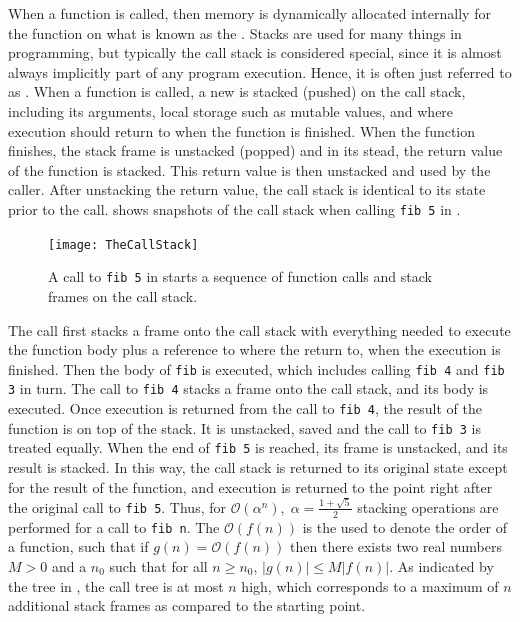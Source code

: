 When a function is called, then memory is dynamically allocated internally for the function on what is known as the . Stacks are used for many things in programming, but typically the call stack is considered special, since it is almost always implicitly part of any program execution. Hence, it is often just referred to as . When a function is called, a new  is stacked (pushed) on the call stack, including its arguments, local storage such as mutable values, and where execution should return to when the function is finished. When the function finishes, the stack frame is unstacked (popped) and in its stead, the return value of the function is stacked. This return value is then unstacked and used by the caller. After unstacking the return value, the call stack is identical to its state prior to the call.  shows snapshots of the call stack when calling \lstinline{fib 5} in . 
\begin{figure}
  \centering
  \texttt{[image: TheCallStack]}
  \caption{A call to \lstinline{fib 5} in  starts a sequence of function calls and stack frames on the call stack.}
  \label{fig:TheStack}
\end{figure}
The call first stacks a frame onto the call stack with everything needed to execute the function body plus a reference to where the return to, when the execution is finished. Then the body of \lstinline{fib} is executed, which includes calling \lstinline{fib 4} and \lstinline{fib 3} in turn. The call to \lstinline{fib 4} stacks a frame onto the call stack, and its body is executed. Once execution is returned from the call to \lstinline{fib 4}, the result of the function is on top of the stack. It is unstacked, saved and the call to \lstinline{fib 3} is treated equally. When the end of \lstinline{fib 5} is reached, its frame is unstacked, and its result is stacked. In this way, the call stack is returned to its original state except for the result of the function, and execution is returned to the point right after the original call to \lstinline{fib 5}. Thus, for  $\mathcal{O}\left(\alpha^n\right),\; \alpha=\frac{1+\sqrt{5}}{2}$ stacking operations are performed for a call to \lstinline{fib n}. The $\mathcal{O}\left(f(n)\right)$ is the  used to denote the order of a function, such that if $g(n) = \mathcal{O}(f(n))$ then there exists two real numbers $M>0$ and a $n_0$ such that for all $n\geq n_0$, $|g(n)| \leq M |f(n)|$. As indicated by the tree in , the call tree is at most $n$ high, which corresponds to a maximum of $n$ additional stack frames as compared to the starting point.

